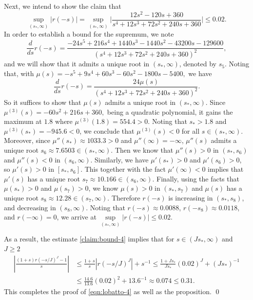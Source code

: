 Next, we intend to show the claim that
\begin{equation}\label{claim:bound-4}
 \sup\limits_{(s_*, \infty)}
   \big|r(-s)\big| =   \sup\limits_{(s_*, \infty)}  \big|\frac{12s^2-120s+360}{s^4+12s^3+72s^2 + 240s + 360}\Big| \le  0.02.
\end{equation}
In order to establish a bound for the supremum, we note
$$\frac{d}{ds}r(-s)
= \frac{-24s^5+216s^4+1440s^3-1440s^2-43200s-129600}
{(s^4+12s^3+72s^2 + 240s + 360)^2}, $$
and we will show that it admits a unique root in $(s_*, \infty)$,
denoted by $s_5$. Noting that, with
$\mu(s) = -s^5+9s^4+60s^3-60s^2-1800s-5400, $
we have
$$\frac{d}{ds}r(-s) = \frac{24\mu(s)}{(s^4+12s^3+72s^2 + 240s + 360)^2}.$$
So it suffices to show that $\mu(s)$ admits a unique  root in $(s_*, \infty)$. Since
$\mu^{(3)}(s)=-60s^2+216s+360,$ being a quadratic polynomial,
it gains the maximum at $1.8$ where
$\mu^{(3)}(1.8) = 554.4>0$.
Noting that $s_*>1.8$ and $\mu^{(3)}(s_*)=-945.6<0$,
we conclude that $\mu^{(3)}(s)<0$ for all $s\in(s_*, \infty)$.
Moreover, since $\mu''(s_*) \approx 1033.3 >0$ and $\mu''(\infty) =-\infty$, $\mu''(s)$ admits a unique root $s_6\approx 7.6503 \in (s_*, \infty)$. Then we know that $\mu''(s) > 0$ in $(s_*, s_6)$
and $\mu''(s) < 0$ in $(s_6, \infty)$.
Similarly, we have $\mu'(s_*) >0$ and $\mu'(s_6) >0$,
so  $\mu'(s) > 0$ in $[s_*, s_6]$. This together with the fact  $\mu'(\infty) <0$ implies that
$\mu'(s)$ has a unique root $s_7\approx 10.166 \in (s_6, \infty)$.
Finally, using the facts that $\mu(s_*)>0$ and $\mu(s_7)>0$,
we know $\mu(s) >0 $ in  $(s_*, s_7)$ and
 $\mu(s)$ has a unique root $s_8 \approx 12.28 \in (s_7, \infty)$.
Therefore $r(-s)$ is increasing in $(s_*, s_8)$,
and decreasing in $(s_8, \infty)$.
Noting that $r(-s)\approx 0.0088$, $r(-s_8)\approx 0.0118$, and $r(-\infty)=0$, we arrive at
$\sup\limits_{(s_*, \infty)}
\big|r(-s)\big| \le 0.02.$


As a result, the estimate \eqref{claim:bound-4} implies that
for $s\in (Js_*,\infty)$ and $J\ge 2$
\begin{equation*}
\begin{split}
    \left|\frac{(1+s) r(-s/J)^J-1}{s}\right|
    &\le \frac{1+s}{s}|r(-s/J)^J|+s^{-1}
    \le \frac{1+Js_*}{Js_*} (0.02)^J + (Js_*)^{-1}    \\
    &\le  \frac{14.6}{13.6} (0.02)^2 + 13.6^{-1}
    \approx 0.074 \le 0.31.
\end{split}
\end{equation*}
This completes the proof of \eqref{eqn:lobatto-4} as well as the proposition.
\qed



% 

